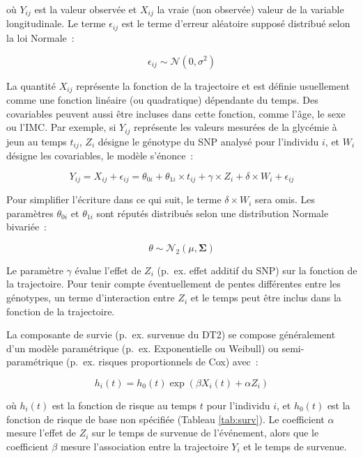 \documentclass[11pt,a4paper,notrimn]{krantz}
\theoremstyle{definition}
\theoremstyle{definition}
\theoremstyle{remark}
\begin{document}
où \(Y_{ij}\) est la valeur observée et \(X_{ij}\) la vraie (non
observée) valeur de la variable longitudinale. Le terme
\(\epsilon_{ij}\) est le terme d'erreur aléatoire supposé distribué
selon la loi Normale~:

\begin{equation}\epsilon_{ij} \sim \mathcal{N}(0, \sigma^2)\label{eq:eq2}\end{equation}

La quantité \(X_{ij}\) représente la fonction de la trajectoire et est
définie usuellement comme une fonction linéaire (ou quadratique)
dépendante du temps. Des covariables peuvent aussi être incluses dans
cette fonction, comme l'âge, le sexe ou l'IMC. Par exemple, si
\(Y_{ij}\) représente les valeurs mesurées de la glycémie à jeun au
temps \(t_{ij}\), \(Z_i\) désigne le génotype du SNP analysé pour
l'individu \(i\), et \(W_i\) désigne les covariables, le modèle
s'énonce~:

\begin{equation}Y_{ij}=X_{ij}+\epsilon_{ij}=\theta_{0i}+\theta_{1i}\times t_{ij}+\gamma \times Z_i+\delta \times W_i + \epsilon_{ij}\label{eq:eq3}\end{equation}

Pour simplifier l'écriture dans ce qui suit, le terme
\(\delta \times W_i\) sera omis. Les paramètres \(\theta_{0i}\) et
\(\theta_{1i}\) sont réputés distribués selon une distribution Normale
bivariée~:

\begin{equation}\theta \sim \mathcal{N}_2(\mu, \boldsymbol{\Sigma})\label{eq:eq4}\end{equation}

Le paramètre \(\gamma\) évalue l'effet de \(Z_i\) (p.~ex. effet additif
du SNP) sur la fonction de la trajectoire. Pour tenir compte
éventuellement de pentes différentes entre les génotypes, un terme
d'interaction entre \(Z_i\) et le temps peut être inclus dans la
fonction de la trajectoire.

La composante de survie (p.~ex. survenue du DT2) se compose généralement
d'un modèle paramétrique (p.~ex. Exponentielle ou Weibull) ou
semi-paramétrique (p.~ex. risques proportionnels de Cox) avec~:

\begin{equation}h_i(t)=h_0(t) \exp(\beta X_i(t)+\alpha Z_i)\label{eq:eq5}\end{equation}

où \(h_i(t)\) est la fonction de risque au temps \(t\) pour l'individu
\(i\), et \(h_0(t)\) est la fonction de risque de base non spécifiée
(Tableau \ref{tab:surv}). Le coefficient \(\alpha\) mesure l'effet de
\(Z_i\) sur le temps de survenue de l'événement, alors que le
coefficient \(\beta\) mesure l'association entre la trajectoire \(Y_i\)
et le temps de survenue.
\end{document}
